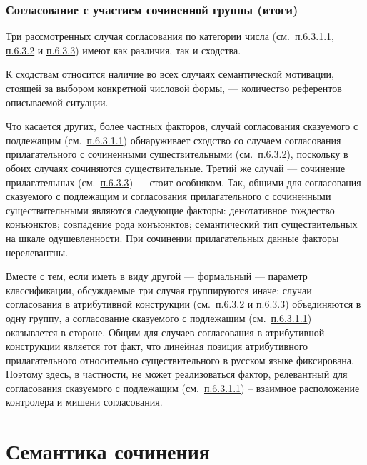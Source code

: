 \subsubsection{Согласование с участием сочиненной группы
(итоги)}\label{ux441ux43eux433ux43bux430ux441ux43eux432ux430ux43dux438ux435-ux441-ux443ux447ux430ux441ux442ux438ux435ux43c-ux441ux43eux447ux438ux43dux435ux43dux43dux43eux439-ux433ux440ux443ux43fux43fux44b-ux438ux442ux43eux433ux438}

Три рассмотренных случая согласования по категории числа
(см.~\underline{п.6.3.1.1}, \underline{п.6.3.2} и \underline{п.6.3.3})
имеют как различия, так и сходства.

К сходствам относится наличие во всех случаях семантической мотивации,
стоящей за выбором конкретной числовой формы, --- количество референтов
описываемой ситуации.

Что касается других, более частных факторов, случай согласования
сказуемого с подлежащим (см.~\underline{п.6.3.1.1}) обнаруживает
сходство со случаем согласования прилагательного с сочиненными
существительными (см.~\underline{п.6.3.2}), поскольку в обоих случаях
сочиняются существительные. Третий же случай --- сочинение прилагательных
(см.~\underline{п.6.3.3}) --- стоит особняком. Так, общими для
согласования сказуемого с подлежащим и согласования прилагательного с
сочиненными существительными являются следующие факторы: денотативное
тождество конъюнктов; совпадение рода конъюнктов; семантический тип
существительных на шкале одушевленности. При сочинении прилагательных
данные факторы нерелевантны.

Вместе с тем, если иметь в виду другой --- формальный --- параметр
классификации, обсуждаемые три случая группируются иначе: случаи
согласования в атрибутивной конструкции (см.~\underline{п.6.3.2} и
\underline{п.6.3.3}) объединяются в одну группу, а согласование
сказуемого с подлежащим (см.~\underline{п.6.3.1.1}) оказывается в
стороне. Общим для случаев согласования в атрибутивной конструкции
является тот факт, что линейная позиция атрибутивного прилагательного
относительно существительного в русском языке фиксирована. Поэтому
здесь, в частности, не может реализоваться фактор, релевантный для
согласования сказуемого с подлежащим (см.~\underline{п.6.3.1.1}) --
взаимное расположение контролера и мишени согласования.

\section{Семантика
сочинения}\label{ux441ux435ux43cux430ux43dux442ux438ux43aux430-ux441ux43eux447ux438ux43dux435ux43dux438ux44f}

